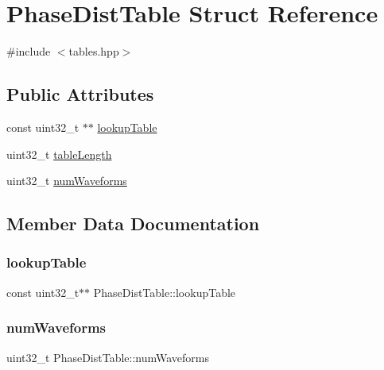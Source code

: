\hypertarget{struct_phase_dist_table}{}\section{Phase\+Dist\+Table Struct Reference}
\label{struct_phase_dist_table}


{\ttfamily \#include $<$tables.\+hpp$>$}

\subsection*{Public Attributes}
\begin{DoxyCompactItemize}
\item 
const uint32\+\_\+t $\ast$$\ast$ \mbox{\hyperlink{struct_phase_dist_table_a1ea4ecdd2fd2755e8569d941da2eae4c}{lookup\+Table}}
\item 
uint32\+\_\+t \mbox{\hyperlink{struct_phase_dist_table_a1b871e67ce74c58645cd378ab683bc5d}{table\+Length}}
\item 
uint32\+\_\+t \mbox{\hyperlink{struct_phase_dist_table_a023efda4043cb3f09c93f6df8bbefcf1}{num\+Waveforms}}
\end{DoxyCompactItemize}


\subsection{Member Data Documentation}
\mbox{\label{struct_phase_dist_table_a1ea4ecdd2fd2755e8569d941da2eae4c}} 
\subsubsection{\texorpdfstring{lookup\+Table}{lookupTable}}
{\footnotesize\ttfamily const uint32\+\_\+t$\ast$$\ast$ Phase\+Dist\+Table\+::lookup\+Table}

\mbox{\label{struct_phase_dist_table_a023efda4043cb3f09c93f6df8bbefcf1}} 
\subsubsection{\texorpdfstring{num\+Waveforms}{numWaveforms}}
{\footnotesize\ttfamily uint32\+\_\+t Phase\+Dist\+Table\+::num\+Waveforms}

